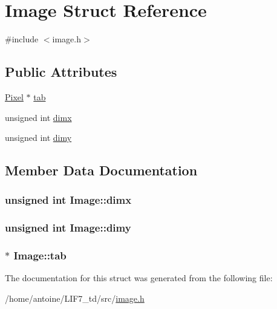 \hypertarget{structImage}{\section{Image Struct Reference}
\label{structImage}
}


{\ttfamily \#include $<$image.\-h$>$}

\subsection*{Public Attributes}
\begin{DoxyCompactItemize}
\item 
\hyperlink{structPixel}{Pixel} $\ast$ \hyperlink{structImage_aa8d8f858fa81a873f20acdb61281bfb3}{tab}
\item 
unsigned int \hyperlink{structImage_a846f530876e1296835bd6ab42a22890d}{dimx}
\item 
unsigned int \hyperlink{structImage_a02275f30d94fbc73fd8f6d594823acf4}{dimy}
\end{DoxyCompactItemize}


\subsection{Member Data Documentation}
\hypertarget{structImage_a846f530876e1296835bd6ab42a22890d}{
\subsubsection[{dimx}]{\setlength{\rightskip}{0pt plus 5cm}unsigned int Image\-::dimx}}\label{structImage_a846f530876e1296835bd6ab42a22890d}
\hypertarget{structImage_a02275f30d94fbc73fd8f6d594823acf4}{
\subsubsection[{dimy}]{\setlength{\rightskip}{0pt plus 5cm}unsigned int Image\-::dimy}}\label{structImage_a02275f30d94fbc73fd8f6d594823acf4}
\hypertarget{structImage_aa8d8f858fa81a873f20acdb61281bfb3}{
\subsubsection[{tab}]{$\ast$ Image\-::tab}}\label{structImage_aa8d8f858fa81a873f20acdb61281bfb3}


The documentation for this struct was generated from the following file\-:\begin{DoxyCompactItemize}
\item 
/home/antoine/\-L\-I\-F7\-\_\-td/src/\hyperlink{image_8h}{image.\-h}\end{DoxyCompactItemize}
